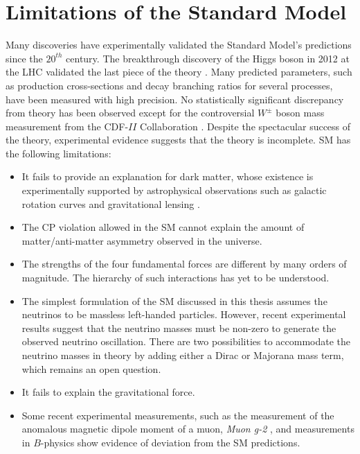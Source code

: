 \section{Limitations of the Standard Model} 
\label{sec:SM_Incomplete}

Many discoveries have experimentally validated the Standard Model's predictions since the $20^{th}$ century. The breakthrough discovery of the Higgs boson in 2012 at the LHC validated the last piece of the theory \cite{CMSHiggsDiscovery}\cite{ATLASHiggsDiscovery}. Many predicted parameters, such as production cross-sections and decay branching ratios for several processes, have been measured with high precision. No statistically significant discrepancy from theory has been observed except for the controversial $W^{\pm}$ boson mass measurement from the CDF-$II$ Collaboration \cite{CDFWMass}. Despite the spectacular success of the theory, experimental evidence suggests that the theory is incomplete. SM has the following limitations:

\begin{itemize}

\item{It fails to provide an explanation for dark matter, whose existence is experimentally supported by astrophysical observations such as galactic rotation curves and gravitational lensing \cite{DMGravitationalLensing}. }

\item{The CP violation allowed in the SM cannot explain the amount of matter/anti-matter asymmetry observed in the universe. }

\item{ The strengths of the four fundamental forces are different by many orders of magnitude. The hierarchy of such interactions has yet to be understood.}

\item{ The simplest formulation of the SM discussed in this thesis assumes the neutrinos to be massless left-handed particles. However, recent experimental results suggest that the neutrino masses must be non-zero to generate the observed neutrino oscillation\cite{NeutrinoOscillation}. There are two possibilities to accommodate the neutrino masses in theory by adding either a Dirac or Majorana mass term, which remains an open question. } 

\item{It fails to explain the gravitational force.}

\item{Some recent experimental measurements, such as the measurement of the anomalous magnetic dipole moment of a muon, \textit{Muon g-2} \cite{MuonG2}, and measurements in $B$-physics \cite{LHCB_BPhys} show evidence of deviation from the SM predictions.}

\end{itemize}
 
